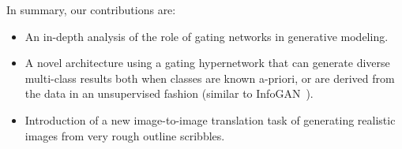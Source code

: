 

%



In summary, our contributions are:
\setlength\itemsep{0px}
\begin{itemize}
\itemsep0em 
\item An in-depth analysis of the role of gating networks in generative modeling.
\item A novel architecture using a gating hypernetwork that can generate diverse multi-class results both when classes are known a-priori, or are derived from the data in an unsupervised fashion (similar to InfoGAN~\cite{chen2016infogan}).
\item Introduction of a new image-to-image translation task of generating realistic images from very rough outline scribbles.
\end{itemize}